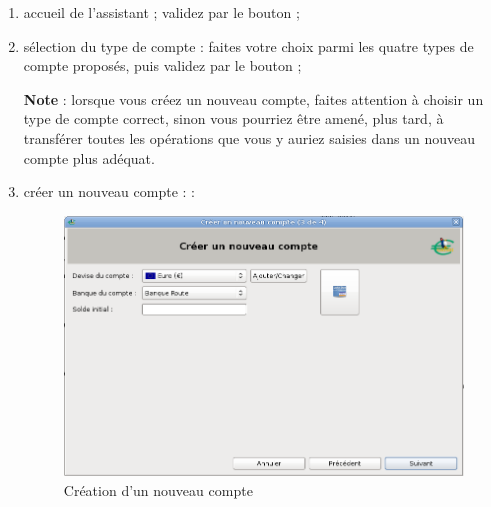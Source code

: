 \begin{enumerate}
	\item accueil de l'assistant ; validez par le bouton  ;
	\item sélection du type de compte : faites votre choix parmi les quatre types de compte proposés, puis validez par le bouton  ;

\textbf{Note} : lorsque vous créez un nouveau compte, faites attention à choisir un type de compte correct, sinon vous pourriez être amené, plus tard, à transférer toutes les opérations que vous y auriez saisies dans un nouveau compte plus adéquat.
	\item créer un nouveau compte \ifIllustration {} :
	\else  :
	\fi
	
	\ifIllustration
	\begin{figure}[htbp]
	\begin{center}
	\includegraphics[scale=0.5]{image/screenshot/account_new_creation}
	\end{center}
	\caption{Création d'un nouveau compte}
	\label{account-new-creation-img}
	\end{figure}
	\fi
	

\end{enumerate}
